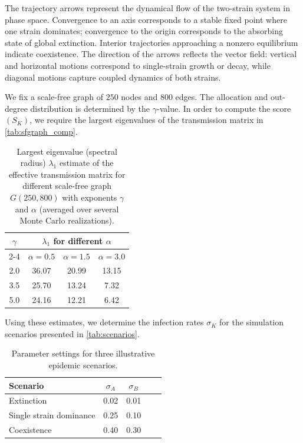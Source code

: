 \documentclass[a4paper,12pt]{scrartcl}
\theoremstyle{plain}%
\theoremstyle{definition}
\theoremstyle{remark}
\numberwithin{equation}{section}
\begin{document}
The trajectory arrows represent the dynamical flow of the two-strain system in phase space. Convergence to an axis corresponds to a stable fixed point where one strain dominates; convergence to the origin corresponds to the absorbing state of global extinction. Interior trajectories approaching a nonzero equilibrium indicate coexistence. The direction of the arrows reflects the vector field: vertical and horizontal motions correspond to single-strain growth or decay, while diagonal motions capture coupled dynamics of both strains.

We fix a scale-free graph of $250$ nodes and $800$ edges. The allocation and out-degree distribution is determined by the $\gamma$-value. In order to compute the score $(S_K)$, we require the largest eigenvalues of the transmission matrix in \autoref{tab:sfgraph_comp}.


\begin{table}[ht]
\centering
\begin{tabular}{c|ccc}
\hline
    $\gamma$ & \multicolumn{3}{c}{$\lambda_{1}$ for different $\alpha$} \\
    \cline{2-4}
 & $\alpha = 0.5$ & $\alpha = 1.5$ & $\alpha = 3.0$ \\
\hline
2.0 & 36.07 & 20.99 & 13.15 \\
3.5 & 25.70 & 13.24 & 7.32 \\
5.0 & 24.16 & 12.21 & 6.42 \\
\hline
\end{tabular}
    \caption{Largest eigenvalue (spectral radius) $\lambda_{1}$ estimate of the effective transmission matrix for different scale-free graph $G(250, 800)$ with exponents $\gamma$ and $\alpha$ (averaged over several Monte Carlo realizations).}
    \label{tab:sfgraph_comp}
\end{table}

Using these estimates, we determine the infection rates $\sigma_K$ for the simulation scenarios presented in \autoref{tab:scenarios}.

\begin{table}[ht!]
\centering
\begin{tabular}{lccc l}
\hline
Scenario    & $\sigma_A$ & $\sigma_B$ \\
\hline
Extinction  & 0.02 & 0.01  \\
Single strain dominance & 0.25 & 0.10 \\
Coexistence & 0.40 & 0.30  \\
\hline
\end{tabular}
\caption{Parameter settings for three illustrative epidemic scenarios.}
\label{tab:scenarios}
\end{table}
\end{document}
